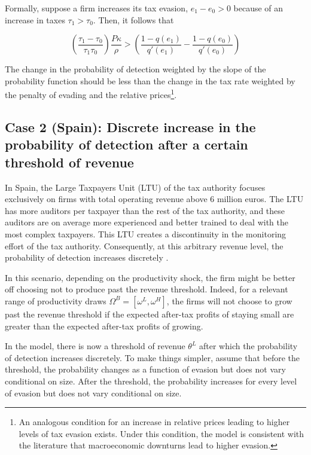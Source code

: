 \documentclass[
  12pt]{article}
\theoremstyle{definition}
\theoremstyle{remark}
\begin{document}
Formally, suppose a firm increases its tax evasion, \(e_1-e_0>0\)
because of an increase in taxes \(\tau_1>\tau_0\). Then, it follows that

\[
\left(\frac{\tau_1-\tau_0}{\tau_1\tau_0}\right)\frac{P\kappa}{\rho}>
  \left(\frac{1-q(e_1)}{q'(e_1)}-\frac{1-q(e_0)}{q'(e_0)}\right)
\]

The change in the probability of detection weighted by the slope of the
probability function should be less than the change in the tax rate
weighted by the penalty of evading and the relative prices\footnote{An
  analogous condition for an increase in relative prices leading to
  higher levels of tax evasion exists. Under this condition, the model
  is consistent with the literature that macroeconomic downturns lead to
  higher evasion.}.

\subsection{Case 2 (Spain): Discrete increase in the probability of
detection after a certain threshold of
revenue}\label{case-2-spain-discrete-increase-in-the-probability-of-detection-after-a-certain-threshold-of-revenue}

In Spain, the Large Taxpayers Unit (LTU) of the tax authority focuses
exclusively on firms with total operating revenue above 6 million euros.
The LTU has more auditors per taxpayer than the rest of the tax
authority, and these auditors are on average more experienced and better
trained to deal with the most complex taxpayers. This LTU creates a
discontinuity in the monitoring effort of the tax authority.
Consequently, at this arbitrary revenue level, the probability of
detection increases discretely \citep{Almunia2018}.

In this scenario, depending on the productivity shock, the firm might be
better off choosing not to produce past the revenue threshold. Indeed,
for a relevant range of productivity draws
\(\Omega^B=[\omega^L, \omega^H]\), the firms will not choose to grow
past the revenue threshold if the expected after-tax profits of staying
small are greater than the expected after-tax profits of growing.

In the model, there is now a threshold of revenue \(\theta^L\) after
which the probability of detection increases discretely. To make things
simpler, assume that before the threshold, the probability changes as a
function of evasion but does not vary conditional on size. After the
threshold, the probability increases for every level of evasion but does
not vary conditional on size.
\end{document}
